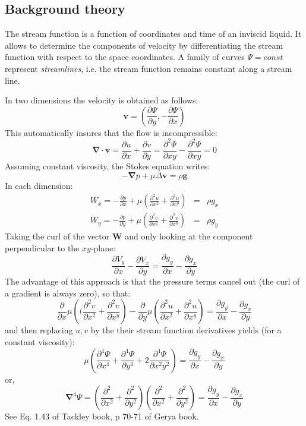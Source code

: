 \subsection{Background theory}
The stream function is a function of coordinates and time of an inviscid liquid.
It allows to determine the components of velocity by differentiating the stream function 
with respect to the space coordinates. 
A family of curves $\Psi = const$ represent {\it streamlines}, i.e. 
the stream function remains constant along a stream line. 

In two dimensions the velocity is obtained as follows:
\begin{equation}
{\bm v} = \left( \frac{\partial \Psi}{\partial y},-\frac{\partial \Psi}{\partial x} \right) 
\end{equation}
This automatically insures that the flow is incompressible:
\begin{equation}
{\bm \nabla}\cdot {\bm v} = 
\frac{\partial u}{\partial x} + \frac{\partial v}{\partial y}
=
\frac{\partial^2 \Psi}{\partial xy} - \frac{\partial^2 \Psi}{\partial xy} =0 
\end{equation}
Assuming constant viscosity, the Stokes equation writes:
\begin{equation}
-{\bm \nabla}p + \mu \Delta {\bm v} = \rho {\bm g}
\end{equation}
In each dimension:
\begin{eqnarray}
W_x=-\frac{\partial p}{\partial x} 
+ \mu\left( \frac{\partial^2 u}{\partial x^2} + \frac{\partial^2 u}{\partial x^y} \right)&=& \rho g_x  \\
W_y=-\frac{\partial p}{\partial y} 
+ \mu \left(\frac{\partial^2 v}{\partial x^2} + \frac{\partial^2 v}{\partial x^y} \right) &=& \rho g_y  
\end{eqnarray}
Taking the curl of the vector ${\bm W}$ and only looking at the component perpendicular to the $xy$-plane:
\begin{equation}
\frac{\partial V_y}{\partial x} - \frac{\partial V_x}{\partial y}  = 
\frac{\partial g_y}{\partial x} - \frac{\partial g_x}{\partial y}   
\end{equation}
The advantage of this approach is that the pressure terms cancel out (the curl of a gradient is always zero), 
so that:
\[
\frac{\partial}{\partial x}\mu\left(( \frac{\partial^2 v}{\partial x^2} + \frac{\partial^2 v}{\partial x^y}  \right) 
- \frac{\partial }{\partial y} \mu \left( \frac{\partial^2 u}{\partial x^2} + \frac{\partial^2 u}{\partial x^y} \right) = 
\frac{\partial g_y}{\partial x} - \frac{\partial g_x}{\partial y}   
\]
and then replacing $u,v$ by the their stream function derivatives yields (for a constant viscosity):
\[
\mu \left(\frac{\partial^4 \Psi}{\partial x^4} + 
\frac{\partial^4 \Psi}{\partial y^4} + 
2\frac{\partial^4 \Psi}{\partial x^2y^2} \right)
=
\frac{\partial g_y}{\partial x} - \frac{\partial g_x}{\partial y}   
\]
or, 
\[
{\bm \nabla}^4 \Psi 
=
\left(\frac{\partial^2 }{\partial x^2} + \frac{\partial^2 }{\partial y^2} \right) 
\left(\frac{\partial^2 }{\partial x^2} + \frac{\partial^2 }{\partial y^2} \right) 
=
\frac{\partial g_y}{\partial x} - \frac{\partial g_x}{\partial y}   
\]
See Eq. 1.43 of Tackley book, p 70-71 of Gerya book.

